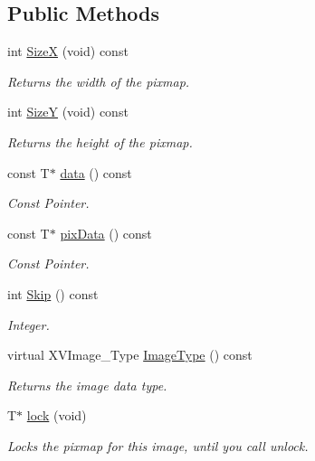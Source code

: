 \subsection*{Public Methods}
\begin{CompactItemize}
\item 
int \hyperlink{class_XVImageBase_a0}{Size\-X} (void) const
\begin{CompactList}\small\item\em Returns the width of the pixmap.\item\end{CompactList}\item 
int \hyperlink{class_XVImageBase_a1}{Size\-Y} (void) const
\begin{CompactList}\small\item\em Returns the height of the pixmap.\item\end{CompactList}\item 
const T$\ast$ \hyperlink{class_XVImageBase_a2}{data} () const
\begin{CompactList}\small\item\em Const Pointer.\item\end{CompactList}\item 
const T$\ast$ \hyperlink{class_XVImageBase_a3}{pix\-Data} () const
\begin{CompactList}\small\item\em Const Pointer.\item\end{CompactList}\item 
int \hyperlink{class_XVImageBase_a4}{Skip} () const
\begin{CompactList}\small\item\em Integer.\item\end{CompactList}\item 
virtual XVImage\_\-Type \hyperlink{class_XVImageBase_a5}{Image\-Type} () const
\begin{CompactList}\small\item\em Returns the image data type.\item\end{CompactList}\item 
T$\ast$ \hyperlink{class_XVImageBase_a6}{lock} (void)
\begin{CompactList}\small\item\em Locks the pixmap for this image, until you call unlock.\item\end{CompactList}\item 

\end{CompactItemize}
